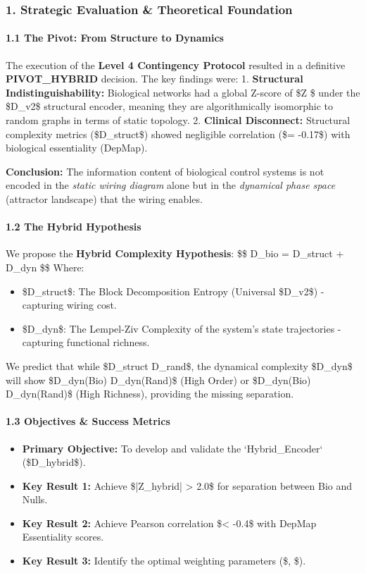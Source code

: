 \documentclass{article}
\begin{document}
\subsubsection{1. Strategic Evaluation \& Theoretical Foundation}

\paragraph{1.1 The Pivot: From Structure to Dynamics}
The execution of the \textbf{Level 4 Contingency Protocol} resulted in a definitive \textbf{PIVOT\_HYBRID} decision. The key findings were:
1.  \textbf{Structural Indistinguishability:} Biological networks had a global Z-score of \$Z \$ under the \$D\_{v2}\$ structural encoder, meaning they are algorithmically isomorphic to random graphs in terms of static topology.
2.  \textbf{Clinical Disconnect:} Structural complexity metrics (\$D\_{struct}\$) showed negligible correlation (\$\rho = -0.17\$) with biological essentiality (DepMap).

\textbf{Conclusion:} The information content of biological control systems is not encoded in the \textit{static wiring diagram} alone but in the \textit{dynamical phase space} (attractor landscape) that the wiring enables.

\paragraph{1.2 The Hybrid Hypothesis}
We propose the \textbf{Hybrid Complexity Hypothesis}:
\$\$ D\_{bio} = \alpha \cdot D\_{struct} + \beta \cdot D\_{dyn} \$\$
Where:
\begin{itemize}
\item   \$D\_{struct}\$: The Block Decomposition Entropy (Universal \$D\_{v2}\$) - capturing wiring cost.
\item   \$D\_{dyn}\$: The Lempel-Ziv Complexity of the system's state trajectories - capturing functional richness.
\end{itemize}

We predict that while \$D\_{struct} \approx D\_{rand}\$, the dynamical complexity \$D\_{dyn}\$ will show \$D\_{dyn}(Bio) \ll D\_{dyn}(Rand)\$ (High Order) or \$D\_{dyn}(Bio) \gg D\_{dyn}(Rand)\$ (High Richness), providing the missing separation.

\paragraph{1.3 Objectives \& Success Metrics}
\begin{itemize}
\item   \textbf{Primary Objective:} To develop and validate the `Hybrid\_Encoder` (\$D\_{hybrid}\$).
\item   \textbf{Key Result 1:} Achieve \$|Z\_{hybrid}| > 2.0\$ for separation between Bio and Nulls.
\item   \textbf{Key Result 2:} Achieve Pearson correlation \$\rho < -0.4\$ with DepMap Essentiality scores.
\item   \textbf{Key Result 3:} Identify the optimal weighting parameters (\$\alpha, \beta\$).
\end{itemize}
\end{document}
